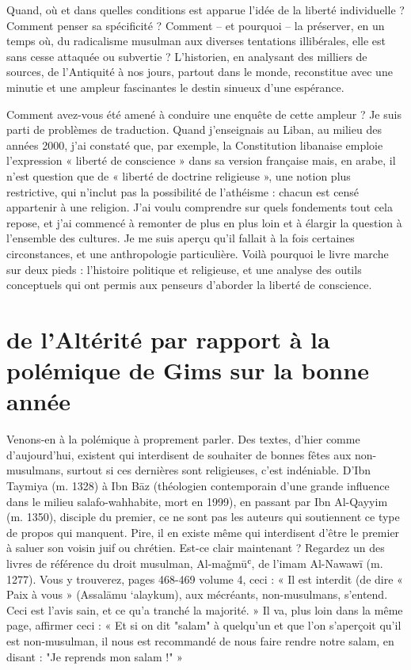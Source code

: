 Quand, où et dans quelles  conditions est apparue l’idée de la liberté individuelle ? Comment penser sa spécificité ? Comment – et pourquoi – la préserver, en un temps où, du radicalisme musulman aux diverses tentations illibérales, elle est sans cesse attaquée ou subvertie ? L’historien, en analysant des milliers de sources, de l’Antiquité à nos jours, partout dans le monde, reconstitue avec une minutie et une ampleur fascinantes le destin sinueux d’une espérance.

Comment avez-vous été amené à conduire une enquête de cette ampleur ?
Je suis parti de problèmes de traduction. Quand j’enseignais au Liban, au milieu des années 2000, j’ai constaté que, par exemple, la Constitution libanaise emploie l’expression « liberté de conscience » dans sa version française mais, en arabe, il n’est question que de « liberté de doctrine  religieuse », une notion plus restrictive, qui n’inclut pas la possibilité de l’athéisme : chacun est censé appartenir à une religion. J’ai voulu comprendre sur quels fondements tout cela repose, et j’ai commencé à remonter de plus en plus loin et à élargir la question à l’ensemble des cultures. Je me suis aperçu qu’il fallait à la fois certaines circonstances, et une anthropologie particulière. Voilà pourquoi le livre marche sur deux pieds : l’histoire  politique et religieuse, et une analyse des outils conceptuels qui ont permis aux penseurs d’aborder la liberté de conscience.
 
 
\section{de l'Altérité par rapport à la polémique de Gims sur la bonne année}

Venons-en à la polémique à proprement parler. Des textes, d’hier comme d’aujourd’hui, existent qui interdisent de souhaiter de bonnes fêtes aux non-musulmans, surtout si ces dernières sont religieuses, c’est indéniable. D’Ibn Taymiya (m. 1328) à Ibn Bāz (théologien contemporain d’une grande influence dans le milieu salafo-wahhabite, mort en 1999), en passant par Ibn Al-Qayyim (m. 1350), disciple du premier, ce ne sont pas les auteurs qui soutiennent ce type de propos qui manquent. Pire, il en existe même qui interdisent d’être le premier à saluer son voisin juif ou chrétien. Est-ce clair maintenant ? Regardez un des livres de référence du droit musulman, Al-maǧmūʿ, de l’imam Al-Nawawī (m. 1277). Vous y trouverez, pages 468-469 volume 4, ceci : « Il est interdit (de dire « Paix à vous » (Assalāmu ‘alaykum), aux mécréants, non-musulmans, s’entend. Ceci est l’avis sain, et ce qu’a tranché la majorité. » Il va, plus loin dans la même page, affirmer ceci : « Et si on dit "salam" à quelqu’un et que l’on s’aperçoit qu’il est non-musulman, il nous est recommandé de nous faire rendre notre salam, en disant : "Je reprends mon salam !" »

